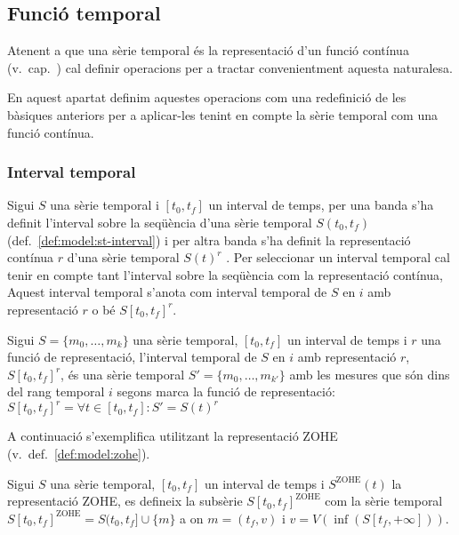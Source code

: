 \subsection{Funció temporal}
\label{sec:sgst:operadors-temporals}

Atenent a que una sèrie temporal és la representació d'un funció
contínua (v.\ cap.~)
cal definir operacions per a tractar convenientment aquesta
naturalesa.

En aquest apartat definim aquestes operacions com una redefinició de
les bàsiques anteriors per a aplicar-les tenint en compte la sèrie
temporal com una funció contínua.



\subsubsection{Interval temporal}

Sigui $S$ una sèrie temporal i $[t_0,t_f]$ un interval de temps, per
una banda s'ha definit l'interval sobre la seqüència d'una sèrie
temporal $S(t_0,t_f)$ (def.~\ref{def:model:st-interval}) i per altra
banda s'ha definit la representació contínua $r$ d'una sèrie temporal
$S(t)^r$ .  Per seleccionar un
interval temporal cal tenir en compte tant l'interval sobre la
seqüència com la representació contínua, Aquest interval temporal
s'anota com interval temporal de $S$ en $i$ amb representació $r$ o bé
$S[t_0,t_f]^r$.



\begin{definition}
  Sigui $S=\{m_0, \ldots, m_k\}$ una sèrie temporal, $[t_0,t_f]$ un
  interval de temps i $r$ una funció de representació, l'interval
  temporal de $S$ en $i$ amb representació $r$, $S[t_0,t_f]^r$, és una
  sèrie temporal $S'=\{m_0, \ldots, m_{k'}\}$ amb les mesures que són
  dins del rang temporal $i$ segons marca la funció de representació:
  $S[t_0,t_f]^r= \forall t \in [t_0,t_f] : S' = S(t)^r $
\end{definition}


A continuació s'exemplifica utilitzant la representació ZOHE (v.\
def.~\ref{def:model:zohe}).
\begin{definition}
  \label{def:sgst:interval-temporal-zohe}
  Sigui $S$ una sèrie temporal, $[t_0,t_f]$ un interval de temps i
  $S^\text{ZOHE}(t)$ la representació ZOHE, es defineix la subsèrie
  $S[t_0,t_f]^{\text{ZOHE}}$ com la sèrie temporal
  $S[t_0,t_f]^{\text{ZOHE}} = S(t_0,t_f] \cup \{m\}$ a on $m=(t_f,v)$
  i $v= V(\inf( S[t_f,+\infty] ))$.
\end{definition}




